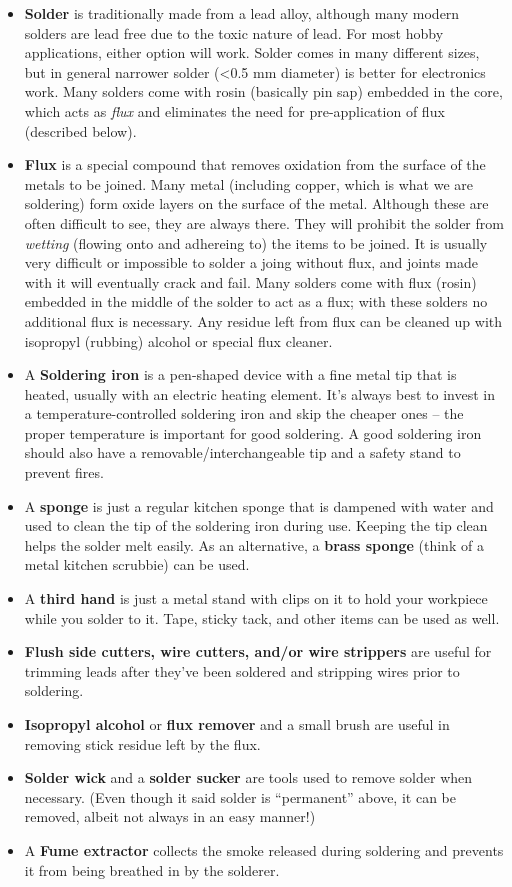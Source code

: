 \documentclass[]{book}
\providecommand{\tightlist}{%
  \setlength{\itemsep}{0pt}\setlength{\parskip}{0pt}}
\begin{document}
\begin{itemize}
\tightlist
\item
  \textbf{Solder} is traditionally made from a lead alloy, although many modern solders are lead free due to the toxic nature of lead. For most hobby applications, either option will work. Solder comes in many different sizes, but in general narrower solder (\textless0.5 mm diameter) is better for electronics work. Many solders come with rosin (basically pin sap) embedded in the core, which acts as \emph{flux} and eliminates the need for pre-application of flux (described below).
\item
  \textbf{Flux} is a special compound that removes oxidation from the surface of the metals to be joined. Many metal (including copper, which is what we are soldering) form oxide layers on the surface of the metal. Although these are often difficult to see, they are always there. They will prohibit the solder from \emph{wetting} (flowing onto and adhereing to) the items to be joined. It is usually very difficult or impossible to solder a joing without flux, and joints made with it will eventually crack and fail. Many solders come with flux (rosin) embedded in the middle of the solder to act as a flux; with these solders no additional flux is necessary. Any residue left from flux can be cleaned up with isopropyl (rubbing) alcohol or special flux cleaner.
\item
  A \textbf{Soldering iron} is a pen-shaped device with a fine metal tip that is heated, usually with an electric heating element. It's always best to invest in a temperature-controlled soldering iron and skip the cheaper ones -- the proper temperature is important for good soldering. A good soldering iron should also have a removable/interchangeable tip and a safety stand to prevent fires.
\item
  A \textbf{sponge} is just a regular kitchen sponge that is dampened with water and used to clean the tip of the soldering iron during use. Keeping the tip clean helps the solder melt easily. As an alternative, a \textbf{brass sponge} (think of a metal kitchen scrubbie) can be used.
\item
  A \textbf{third hand} is just a metal stand with clips on it to hold your workpiece while you solder to it. Tape, sticky tack, and other items can be used as well.
\item
  \textbf{Flush side cutters, wire cutters, and/or wire strippers} are useful for trimming leads after they've been soldered and stripping wires prior to soldering.
\item
  \textbf{Isopropyl alcohol} or \textbf{flux remover} and a small brush are useful in removing stick residue left by the flux.
\item
  \textbf{Solder wick} and a \textbf{solder sucker} are tools used to remove solder when necessary. (Even though it said solder is ``permanent'' above, it can be removed, albeit not always in an easy manner!)
\item
  A \textbf{Fume extractor} collects the smoke released during soldering and prevents it from being breathed in by the solderer.
\end{itemize}
\end{document}
